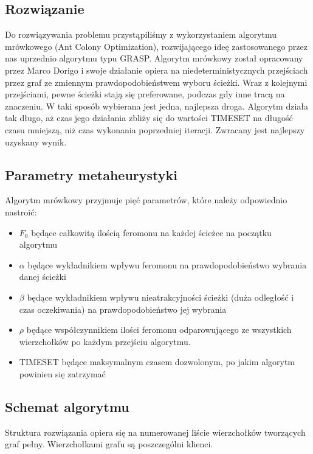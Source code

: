 \documentclass[a4paper]{article}
\begin{document}
\subsection{Rozwiązanie}
Do rozwiązywania problemu przystąpiliśmy z wykorzystaniem algorytmu mrówkowego (Ant Colony Optimization), rozwijającego ideę zastosowanego przez nas uprzednio algorytmu typu GRASP\cite{poprzednie}. Algorytm mrówkowy został opracowany przez Marco Dorigo\cite{dorigo} i swoje działanie opiera na niedeterministycznych przejściach przez graf ze zmiennym prawdopodobieństwem wyboru ścieżki. Wraz z kolejnymi przejściami, pewne ścieżki stają się preferowane, podczas gdy inne tracą na znaczeniu. W taki sposób wybierana jest jedna, najlepsza droga. Algorytm działa tak długo, aż czas jego działania zbliży się do wartości TIMESET na długość czasu mniejszą, niż czas wykonania poprzedniej iteracji. Zwracany jest najlepszy uzyskany wynik.

\subsection{Parametry metaheurystyki}
Algorytm mrówkowy przyjmuje pięć parametrów, które należy odpowiednio nastroić:
\begin{itemize}
\item $F_0$ będące całkowitą ilością feromonu na każdej ścieżce na początku algorytmu
\item $\alpha$ będące wykładnikiem wpływu feromonu na prawdopodobieństwo wybrania danej ścieżki
\item $\beta$ będące wykładnikiem wpływu nieatrakcyjności ścieżki (duża odległość i czas oczekiwania) na prawdopodobieństwo jej wybrania
\item $\rho$ będące współczynnikiem ilości feromonu odparowującego ze wszystkich wierzchołków po każdym przejściu algorytmu.
\item TIMESET będące maksymalnym czasem dozwolonym, po jakim algorytm powinien się zatrzymać
\end{itemize}

\subsection{Schemat algorytmu}
Struktura rozwiązania opiera się na numerowanej liście wierzchołków tworzących graf pełny. Wierzchołkami grafu są poszczególni klienci. 
\end{document}
